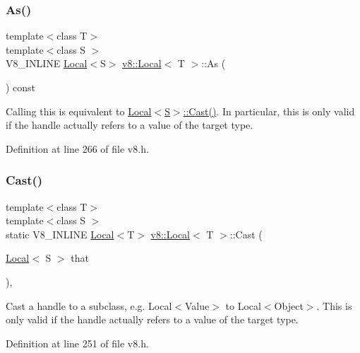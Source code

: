 \subsubsection{\texorpdfstring{As()}{As()}}
{\footnotesize\ttfamily template$<$class T$>$ \\
template$<$class S $>$ \\
V8\+\_\+\+I\+N\+L\+I\+NE \mbox{\hyperlink{classv8_1_1Local}{Local}}$<$S$>$ \mbox{\hyperlink{classv8_1_1Local}{v8\+::\+Local}}$<$ T $>$\+::As (\begin{DoxyParamCaption}{ }\end{DoxyParamCaption}) const\hspace{0.3cm}{\ttfamily [inline]}}

Calling this is equivalent to \mbox{\hyperlink{classv8_1_1Local_a95c8aa28ad098dd160ddd8cb60377bd6}{Local$<$\+S$>$\+::\+Cast()}}. In particular, this is only valid if the handle actually refers to a value of the target type. 

Definition at line 266 of file v8.\+h.

\mbox{\label{classv8_1_1Local_a95c8aa28ad098dd160ddd8cb60377bd6}} 
\subsubsection{\texorpdfstring{Cast()}{Cast()}}
{\footnotesize\ttfamily template$<$class T$>$ \\
template$<$class S $>$ \\
static V8\+\_\+\+I\+N\+L\+I\+NE \mbox{\hyperlink{classv8_1_1Local}{Local}}$<$T$>$ \mbox{\hyperlink{classv8_1_1Local}{v8\+::\+Local}}$<$ T $>$\+::Cast (\begin{DoxyParamCaption}\item[{\mbox{\hyperlink{classv8_1_1Local}{Local}}$<$ S $>$}]{that }\end{DoxyParamCaption})\hspace{0.3cm}{\ttfamily [inline]}, {\ttfamily [static]}}

Cast a handle to a subclass, e.\+g. Local$<$\+Value$>$ to Local$<$\+Object$>$. This is only valid if the handle actually refers to a value of the target type. 

Definition at line 251 of file v8.\+h.

\mbox{\label{classv8_1_1Local_a6fcf63af6bdd697ddd7c3acd16c69899}} 
